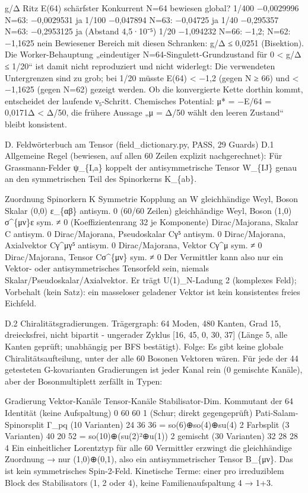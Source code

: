 g/Δ Ritz E(64) schärfster Konkurrent N=64 bewiesen global? 1/400
−0,0029996 N=63: −0,0029531 ja 1/100 −0,047894 N=63: −0,04725 ja 1/40
−0,295357 N=63: −0,2953125 ja (Abstand 4,5·10⁻⁵) 1/20 −1,094232 N=66:
−1,2; N=62: −1,1625 nein Bewiesener Bereich mit diesen Schranken: g/Δ ≤
0,0251 (Bisektion). Die Worker-Behauptung „eindeutiger
N=64-Singulett-Grundzustand für 0 \textless{} \textbar g\textbar/Δ ≤
1/20`` ist damit nicht reproduziert und nicht widerlegt: Die verwendeten
Untergrenzen sind zu grob; bei 1/20 müsste E(64) \textless{} −1,2 (gegen
N ≥ 66) und \textless{} −1,1625 (gegen N=62) gezeigt werden. Ob die
konvergierte Kette dorthin kommt, entscheidet der laufende ν₅-Schritt.
Chemisches Potential: μ* = −E/64 = 0,0171Δ \textless{} Δ/50, die frühere
Aussage „μ = Δ/50 wählt den leeren Zustand`` bleibt konsistent.

D. Feldwörterbuch am Tensor (field\_dictionary.py, PASS, 29 Guards) D.1
Allgemeine Regel (bewiesen, auf allen 60 Zeilen explizit nachgerechnet):
Für Grassmann-Felder ψ\_\{I,a\} koppelt der antisymmetrische Tensor
W\_\{IJ\} genau an den symmetrischen Teil des Spinorkerns K\_\{ab\}.

Zuordnung Spinorkern K Symmetrie Kopplung an W gleichhändige Weyl, Boson
Skalar (0,0) ε\_\{αβ\} antisym. 0 (60/60 Zeilen) gleichhändige Weyl,
Boson (1,0) σ\^{}\{μν\}ε sym. ≠ 0 (Koeffizientenrang 32 je Komponente)
Dirac/Majorana, Skalar C antisym. 0 Dirac/Majorana, Pseudoskalar Cγ⁵
antisym. 0 Dirac/Majorana, Axialvektor Cγ\^{}μγ⁵ antisym. 0
Dirac/Majorana, Vektor Cγ\^{}μ sym. ≠ 0 Dirac/Majorana, Tensor
Cσ\^{}\{μν\} sym. ≠ 0 Der Vermittler kann also nur ein Vektor- oder
antisymmetrisches Tensorfeld sein, niemals
Skalar/Pseudoskalar/Axialvektor. Er trägt U(1)\_N-Ladung 2 (komplexes
Feld); Vorbehalt (kein Satz): ein masseloser geladener Vektor ist kein
konsistentes freies Eichfeld.

D.2 Chiralitätsgradierungen. Trägergraph: 64 Moden, 480 Kanten, Grad 15,
dreiecksfrei, nicht bipartit - ungerader Zyklus {[}16, 45, 0, 30, 37{]}
(Länge 5, alle Kanten geprüft; unabhängig per BFS bestätigt). Folge: Es
gibt keine globale Chiralitätsaufteilung, unter der alle 60 Bosonen
Vektoren wären. Für jede der 44 getesteten G-kovarianten Gradierungen
ist jeder Kanal rein (0 gemischte Kanäle), aber der Bosonmultiplett
zerfällt in Typen:

Gradierung Vektor-Kanäle Tensor-Kanäle Stabilisator-Dim. Kommutant der
64 Identität (keine Aufspaltung) 0 60 60 1 (Schur; direkt gegengeprüft)
Pati-Salam-Spinorsplit Γ\_pq (10 Varianten) 24 36 36 = so(6)⊕\allowbreak{}so(4)⊕\allowbreak{}su(4)
2 Farbsplit (3 Varianten) 40 20 52 = so(10)⊕\allowbreak{}(su(2)²⊕\allowbreak{}u(1)) 2 gemischt (30
Varianten) 32 28 28 4 Ein einheitlicher Lorentztyp für alle 60
Vermittler erzwingt die gleichhändige Zuordnung → nur (1,0)⊕\allowbreak{}(0,1), also
ein antisymmetrischer Tensor B\_\{μν\}. Das ist kein symmetrisches
Spin-2-Feld. Kinetische Terme: einer pro irreduziblem Block des
Stabilisators (1, 2 oder 4), keine Familienaufspaltung 4 → 1+3.

